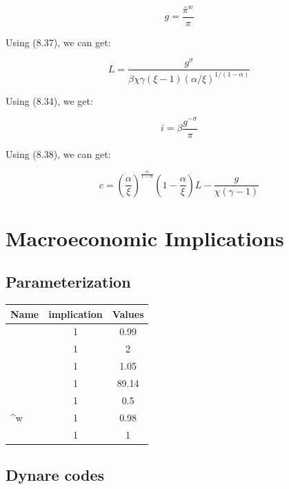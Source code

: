 \documentclass[10pt,math=newtx,citestyle=gb7714-2015,bibstyle=gb7714-2015]{elegantbook}
\begin{document}
{{{ \begin{equation}
 	g = \frac{\bar{\pi}^w}{\pi}
  \end{equation}

Using (8.37), we can get:

\begin{equation}
	L=\frac{g^\sigma}{ \beta \chi \gamma (\xi-1)(\alpha / \xi)^{1 /(1-\alpha)}}
\end{equation}

Using (8.34), we get:

\begin{equation}
	i = \beta \frac{g^{-\sigma}}{\pi}
\end{equation}

	Using (8.38), we can get:
	
	\begin{equation}
			c =  \left(\frac{\alpha}{\xi}\right)^{\frac{\alpha}{1-\alpha}}\left(1-\frac{\alpha}{\xi}\right)L-\frac{g}{\chi(\gamma-1)}
	\end{equation}
	
	\section{Macroeconomic Implications}
	
	\subsection{Parameterization}
	
	\begin{tabular}{|l|c|c|}
	\hline
	Name & implication & Values \\
	\hline
	\beta & 1 & 0.99 \\
	\hline
	\sigma& 1 & 2 \\
	\hline
	\gamma & 1 & 1.05 \\
	\hline
	\chi & 1 & 89.14 \\
	\hline
	\alpha & 1 & 0.5 \\
	\hline
	\pi^w & 1 & 0.98 \\
	\hline
	\phi & 1 & 1 \\
	\hline
\end{tabular}

	\subsection{Dynare codes}
	
}}}
\end{document}
